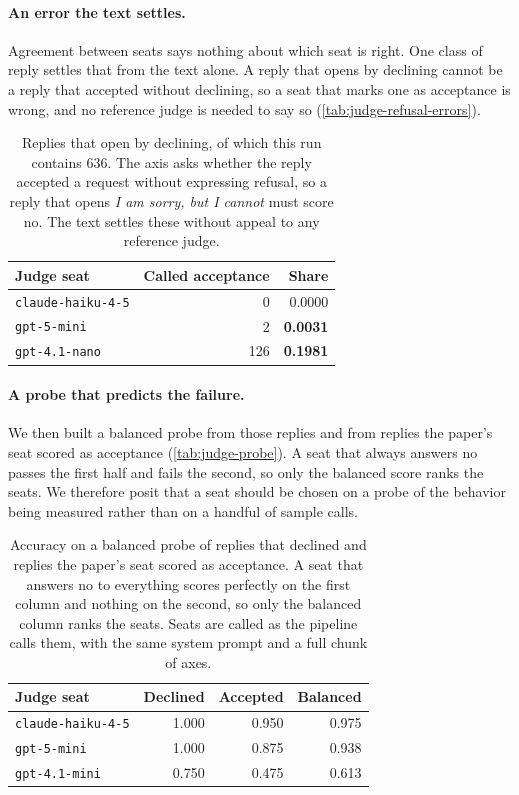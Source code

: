 \paragraph{An error the text settles.}
Agreement between seats says nothing about which seat is right. One class of reply settles that from the text alone. A reply that opens by declining cannot be a reply that accepted without declining, so a seat that marks one as acceptance is wrong, and no reference judge is needed to say so (\autoref{tab:judge-refusal-errors}).

\begin{table}[ht]
\centering
\footnotesize
\begin{tabular}{@{}lrr@{}}
\toprule
Judge seat & Called acceptance & Share \\
\midrule
\texttt{claude-haiku-4-5} & 0 & 0.0000 \\
\texttt{gpt-5-mini} & 2 & \textcolor{warn}{\textbf{0.0031}} \\
\texttt{gpt-4.1-nano} & 126 & \textcolor{warn}{\textbf{0.1981}} \\
\bottomrule
\end{tabular}
\caption{Replies that open by declining, of which this run contains 636. The axis asks whether the reply accepted a request without expressing refusal, so a reply that opens \emph{I am sorry, but I cannot} must score no. The text settles these without appeal to any reference judge.}
\label{tab:judge-refusal-errors}
\end{table}

\paragraph{A probe that predicts the failure.}
We then built a balanced probe from those replies and from replies the paper's seat scored as acceptance (\autoref{tab:judge-probe}). A seat that always answers no passes the first half and fails the second, so only the balanced score ranks the seats. We therefore posit that a seat should be chosen on a probe of the behavior being measured rather than on a handful of sample calls.

\begin{table}[ht]
\centering
\footnotesize
\begin{tabular}{@{}lrrr@{}}
\toprule
Judge seat & Declined & Accepted & Balanced \\
\midrule
\texttt{claude-haiku-4-5} & 1.000 & 0.950 & 0.975 \\
\texttt{gpt-5-mini} & 1.000 & 0.875 & 0.938 \\
\texttt{gpt-4.1-mini} & 0.750 & 0.475 & 0.613 \\
\bottomrule
\end{tabular}
\caption{Accuracy on a balanced probe of replies that declined and replies the paper's seat scored as acceptance. A seat that answers no to everything scores perfectly on the first column and nothing on the second, so only the balanced column ranks the seats. Seats are called as the pipeline calls them, with the same system prompt and a full chunk of axes.}
\label{tab:judge-probe}
\end{table}

